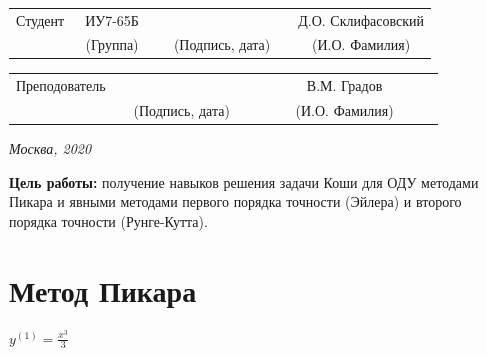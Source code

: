\documentclass[14pt, a4paper]{extarticle}
\begin{document}
\noindent
{}
\\
\\


\noindent
{}
\\

\vspace{1.5cm}
\noindent
\begin{tabular}{l c c c c c}
	Студент      & ~ИУ7-65Б~               & \hspace{2.5cm} & \hspace{2cm}                 & &  Д.О. Склифасовский \\\cline{2-2}\cline{4-4} \cline{6-6} 
	\hspace{3cm} & {\footnotesize(Группа)} &                & {\footnotesize(Подпись, дата)} & & {\footnotesize(И.О. Фамилия)}
\end{tabular}

\noindent
\begin{tabular}{l c c c c}
	Преподователь & \hspace{5cm}   & \hspace{2cm}                 & & ~~~~~~~В.М. Градов~~~~~~~\\\cline{3-3} \cline{5-5} 
	\hspace{3cm}  &                & {\footnotesize(Подпись, дата)} & & {\footnotesize(И.О. Фамилия)}
\end{tabular}

\vspace{0.6cm}
\begin{center}	
	\vfill
	\large \textit {Москва, 2020}
\end{center}

\thispagestyle {empty}
\pagebreak

\clearpage
\textbf{Цель работы:} получение навыков решения задачи Коши для ОДУ  методами Пикара и явными методами первого порядка точности (Эйлера) и второго порядка точности (Рунге-Кутта).
\section{Метод Пикара}
$y^{(1)}=\frac{x^3}{3}$
\end{document}
